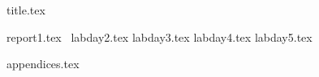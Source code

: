 \documentclass[final]{scrartcl} %
\begin{document}

{title.tex}

\newpage

\tableofcontents

\newpage
{}
{report1.tex}
\newpage\
{labday2.tex}
\newpage
{labday3.tex}
\newpage
{labday4.tex}
\newpage
{labday5.tex}
\newpage
{}

\printbibliography
{appendices.tex}
\end{document}
